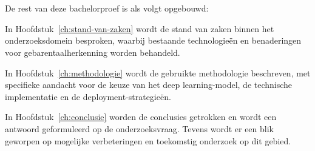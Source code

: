\section{}
\label{sec:opzet-bachelorproef}

De rest van deze bachelorproef is als volgt opgebouwd:

In Hoofdstuk~\ref{ch:stand-van-zaken} wordt de stand van zaken binnen het onderzoeksdomein besproken, waarbij bestaande technologieën en benaderingen voor gebarentaalherkenning worden behandeld.

In Hoofdstuk~\ref{ch:methodologie} wordt de gebruikte methodologie beschreven, met specifieke aandacht voor de keuze van het deep learning-model, de technische implementatie en de deployment-strategieën.

In Hoofdstuk~\ref{ch:conclusie} worden de conclusies getrokken en wordt een antwoord geformuleerd op de onderzoeksvraag. Tevens wordt er een blik geworpen op mogelijke verbeteringen en toekomstig onderzoek op dit gebied.
